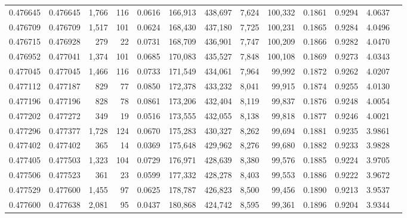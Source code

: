\begin{tabular}{rrrrrrrrrrrrr}
0.476645 & 0.476645 & 1,766 &   116 &                                     0.0616 & 166,913 & 438,697 &   7,624 & 100,332 & 0.1861 & 0.9294 & 4.0637 \\
0.476709 & 0.476709 & 1,517 &   101 &                                     0.0624 & 168,430 & 437,180 &   7,725 & 100,231 & 0.1865 & 0.9284 & 4.0496 \\
0.476715 & 0.476928 &   279 &    22 &                                     0.0731 & 168,709 & 436,901 &   7,747 & 100,209 & 0.1866 & 0.9282 & 4.0470 \\
0.476952 & 0.477041 & 1,374 &   101 &                                     0.0685 & 170,083 & 435,527 &   7,848 & 100,108 & 0.1869 & 0.9273 & 4.0343 \\
0.477045 & 0.477045 & 1,466 &   116 &                                     0.0733 & 171,549 & 434,061 &   7,964 &  99,992 & 0.1872 & 0.9262 & 4.0207 \\
0.477112 & 0.477187 &   829 &    77 &                                     0.0850 & 172,378 & 433,232 &   8,041 &  99,915 & 0.1874 & 0.9255 & 4.0130 \\
0.477196 & 0.477196 &   828 &    78 &                                     0.0861 & 173,206 & 432,404 &   8,119 &  99,837 & 0.1876 & 0.9248 & 4.0054 \\
0.477202 & 0.477272 &   349 &    19 &                                     0.0516 & 173,555 & 432,055 &   8,138 &  99,818 & 0.1877 & 0.9246 & 4.0021 \\
0.477296 & 0.477377 & 1,728 &   124 &                                     0.0670 & 175,283 & 430,327 &   8,262 &  99,694 & 0.1881 & 0.9235 & 3.9861 \\
0.477402 & 0.477402 &   365 &    14 &                                     0.0369 & 175,648 & 429,962 &   8,276 &  99,680 & 0.1882 & 0.9233 & 3.9828 \\
0.477405 & 0.477503 & 1,323 &   104 &                                     0.0729 & 176,971 & 428,639 &   8,380 &  99,576 & 0.1885 & 0.9224 & 3.9705 \\
0.477506 & 0.477523 &   361 &    23 &                                     0.0599 & 177,332 & 428,278 &   8,403 &  99,553 & 0.1886 & 0.9222 & 3.9672 \\
0.477529 & 0.477600 & 1,455 &    97 &                                     0.0625 & 178,787 & 426,823 &   8,500 &  99,456 & 0.1890 & 0.9213 & 3.9537 \\
0.477600 & 0.477638 & 2,081 &    95 &                                     0.0437 & 180,868 & 424,742 &   8,595 &  99,361 & 0.1896 & 0.9204 & 3.9344 \\

\end{tabular}
